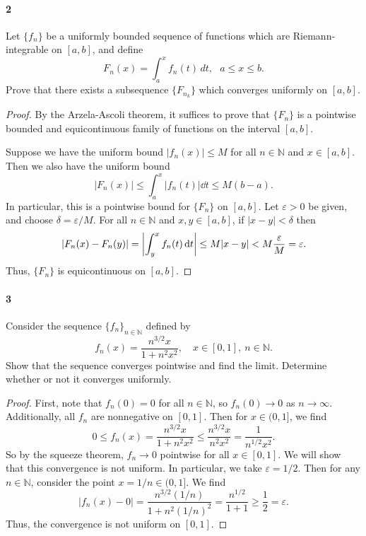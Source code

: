 \documentclass[12pt]{article}
\newenvironment{fullbox}{\begin{lrbox}{\savefullbox}\begin{minipage}{\dimexpr\textwidth-2\fboxsep\relax}}{\end{minipage}\end{lrbox}\begin{center}\framebox[\textwidth]{\usebox{\savefullbox}}\end{center}}
\newenvironment{pbox}[1][]{\begin{fullbox}\ifx#1\empty\else\paragraph{#1}\fi}{\end{fullbox}}
\theoremstyle{definition}
\newcommand{\N}{\mathbb{N}}
\newcommand{\eps}{\varepsilon}
\begin{document}
\newpage
\begin{pbox}[2]
    Let $\{f_n\}$ be a uniformly bounded sequence of functions which are Riemann-integrable on $[a,b]$, and define
    \[
     F_n(x) = \int_a^x f_n(t)\,dt,\ \ \ a \le x \le b.
    \]
Prove that there exists a subsequence $\{F_{n_k}\}$ which converges uniformly on $[a,b]$.
\end{pbox}

\begin{proof}
    By the Arzela-Ascoli theorem, it suffices to prove that $\{F_n\}$ is a pointwise bounded and equicontinuous family of functions on the interval $[a, b]$.
    
    Suppose we have the uniform bound $|f_n(x)| \leq M$ for all $n \in \N$ and $x \in [a, b]$. Then we also have the uniform bound
    \[
        |F_n(x)|
            \leq \int_{a}^{x} |f_n(t)| \dd{t}
            \leq M(b - a).
    \]
    In particular, this is a pointwise bound for $\{F_n\}$ on $[a, b]$. Let $\eps > 0$ be given, and choose $\delta = \eps/M$. For all $n \in \N$ and $x, y \in [a, b]$, if $|x - y| < \delta$ then
    \[
        |F_n(x) - F_n(y)|
            = \abs{\int_{y}^{x} f_n(t) \dd{t}}
            \leq M|x - y|
            < M\frac{\eps}{M}
            = \eps.
    \]
    Thus, $\{F_n\}$ is equicontinuous on $[a, b]$.
    
\end{proof}




\begin{pbox}[3]
    Consider  the sequence $\{f_n\}_{n\in\N}$ defined by 
    \begin{equation}
    f_n(x) = \frac{n^{3/2}x}{1+n^2x^2},\quad x\in [0,1],\ n\in \N.
    \end{equation}
    Show that the sequence converges pointwise and find the limit. Determine whether or not it converges uniformly.
\end{pbox}

\begin{proof}
    First, note that $f_n(0) = 0$ for all $n \in \N$, so $f_n(0) \to 0$ as $n \to \infty$. Additionally, all $f_n$ are nonnegative on $[0, 1]$. Then for $x \in (0, 1]$, we find
    \[
        0 \leq f_n(x)
            = \frac{n^{3/2}x}{1 + n^2x^2}
            \leq \frac{n^{3/2}x}{n^2x^2}
            = \frac{1}{n^{1/2}x^2}.
    \]
    So by the squeeze theorem, $f_n \to 0$ pointwise for all $x \in [0, 1]$. We will show that this convergence is not uniform. In particular, we take $\eps = 1/2$. Then for any $n \in \N$, consider the point $x = 1/n \in (0, 1]$. We find
    \[
        |f_n(x) - 0|
            = \frac{n^{3/2}(1/n)}{1 + n^2(1/n)^2}
            = \frac{n^{1/2}}{1 + 1}
            \geq \frac{1}{2}
            = \eps.
    \]
    Thus, the convergence is not uniform on $[0, 1]$.
    
\end{proof}
\end{document}
